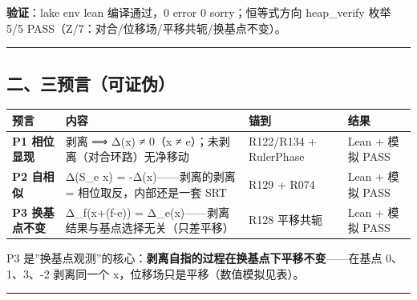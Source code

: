 \documentclass[
]{article}
\newcounter{none} %
\begin{document}
\textbf{验证}：lake env lean 编译通过，0 error 0 sorry；恒等式方向
heap\_verify 枚举 5/5 PASS（Z/7：对合/位移场/平移共轭/换基点不变）。

\begin{center}\rule{0.5\linewidth}{0.5pt}\end{center}

\subsection{二、三预言（可证伪）}\label{ux4e8cux4e09ux9884ux8a00ux53efux8bc1ux4f2a}

{\def\LTcaptype{none} %
\begin{longtable}[]{@{}
  >{\raggedright\arraybackslash}p{}
  >{\raggedright\arraybackslash}p{}
  >{\raggedright\arraybackslash}p{}
  >{\raggedright\arraybackslash}p{}@{}}
\toprule\noalign{}
\begin{minipage}[b]{\linewidth}\raggedright
预言
\end{minipage} & \begin{minipage}[b]{\linewidth}\raggedright
内容
\end{minipage} & \begin{minipage}[b]{\linewidth}\raggedright
锚到
\end{minipage} & \begin{minipage}[b]{\linewidth}\raggedright
结果
\end{minipage} \\
\midrule\noalign{}
\endhead
\bottomrule\noalign{}
\endlastfoot
\textbf{P1 相位显现} & 剥离 ⟹ Δ(x) ≠ 0（x ≠
e）；未剥离（对合环路）无净移动 & R122/R134 + RulerPhase & Lean + 模拟
PASS \\
\textbf{P2 自相似} & Δ(S\_e x) = -Δ(x)------剥离的剥离 =
相位取反，内部还是一套 SRT & R129 + R074 & Lean + 模拟 PASS \\
\textbf{P3 换基点不变} & Δ\_f(x+(f-e)) =
Δ\_e(x)------剥离结果与基点选择无关（只差平移） & R128 平移共轭 & Lean +
模拟 PASS \\
\end{longtable}
}

P3
是''换基点观测''的核心：\textbf{剥离自指的过程在换基点下平移不变}------在基点
0、1、3、-2 剥离同一个 x，位移场只是平移（数值模拟见表）。

\begin{center}\rule{0.5\linewidth}{0.5pt}\end{center}
\end{document}
